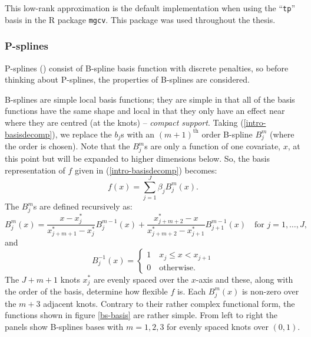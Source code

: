 This low-rank approximation is the default implementation when using the ``\texttt{tp}'' basis in the \textsf{R} package \texttt{mgcv}. This package was used throughout the thesis.

\subsubsection{P-splines}
\label{intro-psplines}

P-splines (\cite{eilersmarx96}) consist of B-spline basis function with discrete penalties, so before thinking about P-splines, the properties of B-splines are considered. 

B-splines are simple local basis functions; they are simple in that all of the basis functions have the same shape and local in that they only have an effect near where they are centred (at the knots) -- \textit{compact support}. Taking (\ref{intro-basisdecomp}), we replace the $b_j$s with an $(m+1)^\text{th}$ order B-spline $B_j^m$ (where the order is chosen). Note that the $B_j^m$s are only a function of one covariate, $x$, at this point but will be expanded to higher dimensions below. So, the basis representation of $f$ given in (\ref{intro-basisdecomp}) becomes:
\begin{equation*}
f(x) = \sum_{j=1}^{J} \beta_j B^m_j(x).
\end{equation*}
The $B_j^m$s are defined recursively as:
\begin{equation*}
B_j^m(x) = \frac{x-x^*_j}{x^*_{j+m+1} - x^*_j} B_j^{m-1}(x) + \frac{x^*_{j+m+2} -x}{x^*_{j+m+2} - x^*_{j+1}} B_{j+1}^{m-1}(x) \quad \text{for } j=1,\ldots,J,
\end{equation*}
and
\begin{equation*}
 B_j^{-1}(x)=\begin{cases}
1 \quad x_j \leq x < x_{j+1}\\
0 \quad \text{otherwise}. 
\end{cases}
\end{equation*}
The $J+m+1$ knots $x^*_j$ are evenly spaced over the $x$-axis and these, along with the order of the basis, determine how flexible $f$ is. Each $B^m_j(x)$ is non-zero over the $m+3$ adjacent knots. Contrary to their rather complex functional form, the functions shown in figure \ref{bs-basis} are rather simple. From left to right the panels show B-splines bases with $m=1,2,3$ for evenly spaced knots over $(0,1)$.

